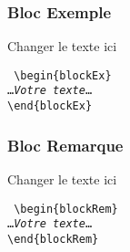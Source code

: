 \documentclass[aspectratio=169]{beamer}
\begin{document}
\begin{frame}
    \frametitle{Bloc \og Exemple\fg}
    \begin{blockEx}
        Changer le texte ici
    \end{blockEx}
\noindent\texttt{%
\textbackslash begin\{blockEx\}\\
\ldots\emph{Votre texte}\ldots\\
\textbackslash end\{blockEx\}
}
\end{frame}
\begin{frame}
    \frametitle{Bloc \og Remarque\fg}
    \begin{blockRem}
        Changer le texte ici
    \end{blockRem}
\noindent\texttt{%
\textbackslash begin\{blockRem\}\\
\ldots\emph{Votre texte}\ldots\\
\textbackslash end\{blockRem\}
}
\end{frame}
\end{document}
